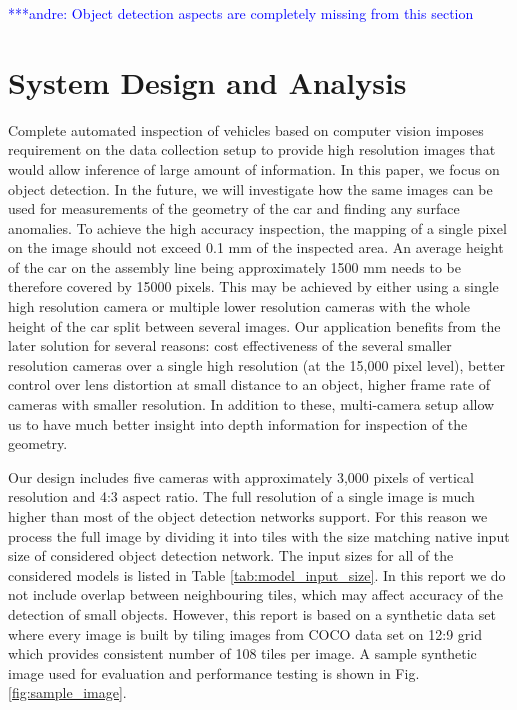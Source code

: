 \documentclass[conference]{IEEEtran}
\newcommand{\alnote}[1]{ {\textcolor{blue} { ***andre: #1 }}}
\newcommand{\alnote}[1]{}
\begin{document}
\alnote{Object detection aspects are completely missing from this section}

\section{System Design and Analysis}
Complete automated inspection of vehicles based on computer vision imposes requirement on the data collection setup to provide high resolution images that would allow inference of large amount of information. In this paper, we focus on object detection. In the future, we will investigate how the same images can be used for measurements of the geometry of the car and finding any surface anomalies. To achieve the high accuracy inspection, the mapping of a single pixel on the image should not exceed 0.1 mm of the inspected area. An average height of the car on the assembly line being approximately 1500 mm needs to be therefore covered by 15000 pixels. This may be achieved by either using a single high resolution camera or multiple lower resolution cameras with the whole height of the car split between several images. Our application benefits from the later solution for several reasons: cost effectiveness of the several smaller resolution cameras over a single high resolution (at the 15,000 pixel level), better control over lens distortion at small distance to an object, higher frame rate of cameras with smaller resolution. In addition to these, multi-camera setup allow us to have much better insight into depth information for inspection of the geometry. 

Our design includes five cameras with approximately 3,000 pixels of vertical resolution and 4:3 aspect ratio. The full resolution of a single image is much higher than most of the object detection networks support. For this reason we process the full image by dividing it into tiles with the size matching native input size of considered object detection network. The input sizes for all of the considered models is listed in Table \ref{tab:model_input_size}. In this report we do not include overlap between neighbouring tiles, which may affect accuracy of the detection of small objects. However, this report is based on a synthetic data set where every image is built by tiling images from COCO data set on 12:9 grid which provides consistent number of 108 tiles per image. A sample synthetic image used for evaluation and performance testing is shown in Fig. \ref{fig:sample_image}.
\end{document}
